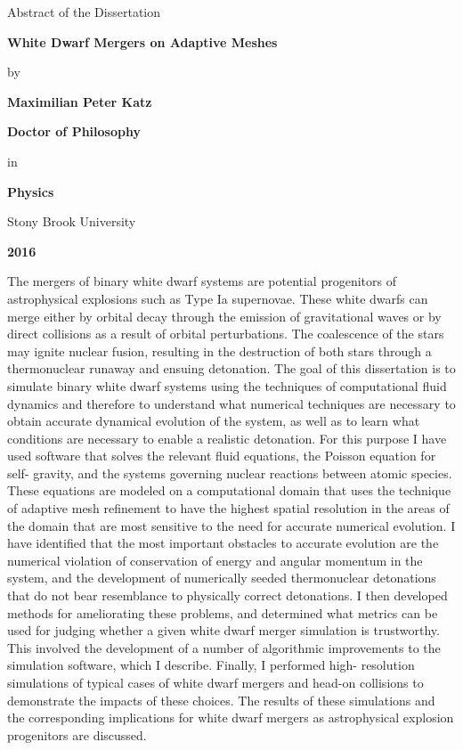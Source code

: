 \documentclass[12pt]{article}
\begin{document}
\newpage

\centerline{Abstract of the Dissertation}
\vspace*{1\baselineskip}
\centerline{\bf{White Dwarf Mergers on Adaptive Meshes}}
\vspace*{1\baselineskip}
\centerline{by}
\vspace*{1\baselineskip}
\centerline{\bf{Maximilian Peter Katz}}
\vspace*{1\baselineskip}
\centerline{\bf{Doctor of Philosophy}}
\vspace*{1\baselineskip}
\centerline{in}
\vspace*{1\baselineskip}
\centerline{\bf{Physics}}
\vspace*{1\baselineskip}
\centerline{Stony Brook University}
\vspace*{1\baselineskip}
\centerline{\bf{2016}}
\vspace*{2\baselineskip}
The mergers of binary white dwarf systems are potential progenitors of astrophysical
explosions such as Type Ia supernovae. These white dwarfs can merge either by orbital
decay through the emission of gravitational waves or by direct collisions as a result of
orbital perturbations. The coalescence of the stars may ignite nuclear fusion, resulting in
the destruction of both stars through a thermonuclear runaway and ensuing detonation.
The goal of this dissertation is to simulate binary white dwarf systems using the
techniques of computational fluid dynamics and therefore to understand what numerical
techniques are necessary to obtain accurate dynamical evolution of the system, as well as
to learn what conditions are necessary to enable a realistic detonation. For this purpose I
have used software that solves the relevant fluid equations, the Poisson equation for self-
gravity, and the systems governing nuclear reactions between atomic species. These
equations are modeled on a computational domain that uses the technique of adaptive
mesh refinement to have the highest spatial resolution in the areas of the domain that are
most sensitive to the need for accurate numerical evolution. I have identified that the
most important obstacles to accurate evolution are the numerical violation of
conservation of energy and angular momentum in the system, and the development of
numerically seeded thermonuclear detonations that do not bear resemblance to physically
correct detonations. I then developed methods for ameliorating these problems, and
determined what metrics can be used for judging whether a given white dwarf merger
simulation is trustworthy. This involved the development of a number of algorithmic
improvements to the simulation software, which I describe. Finally, I performed high-
resolution simulations of typical cases of white dwarf mergers and head-on collisions to
demonstrate the impacts of these choices. The results of these simulations and the
corresponding implications for white dwarf mergers as astrophysical explosion
progenitors are discussed.
\end{document}
